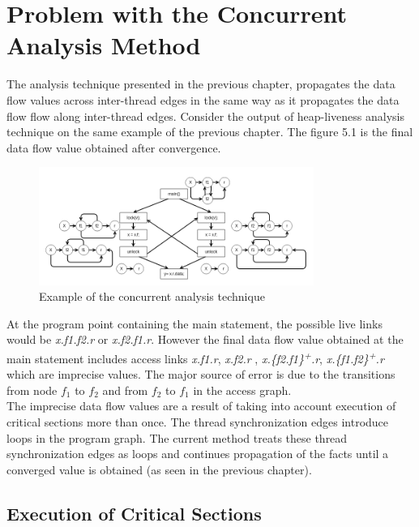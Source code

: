 \chapter{Problem with the Concurrent Analysis Method}

The analysis technique presented in the previous chapter, propagates the data flow values across inter-thread edges in the same way as it propagates the data flow flow along inter-thread edges. Consider the output of heap-liveness analysis technique on the same example of the previous chapter. The figure 5.1 is the final data flow value obtained after convergence. \\

\begin{figure}
	\centering
	\includegraphics[width=0.8\textwidth]{Figures/conc_analysis_itr4.png}
	\caption{Example of the concurrent analysis technique}
	\label{fig:ch5example}
\end{figure}


At the program point containing the main statement, the possible live links would be \emph{x.f1.f2.r} or \emph{x.f2.f1.r}. However the final data flow value  obtained at the main statement includes access links \emph{x.f1.r}, \emph{x.f2.r} , \emph {x.\{f2.f1\}\textsuperscript{+}.r}, \emph{x.\{f1.f2\}\textsuperscript{+}.r} which are imprecise values. The major source of error is due to the transitions from node $f_1$ to $f_2$ and from $f_2$ to $f_1$ in the access graph. \\

The imprecise data flow values are a result of taking into account execution of critical sections more than once. The thread synchronization edges introduce loops in the program graph. The current method treats these thread synchronization edges as loops and continues propagation of the facts until a converged value is obtained (as seen in the previous chapter). \\

\section{Execution of Critical Sections}

